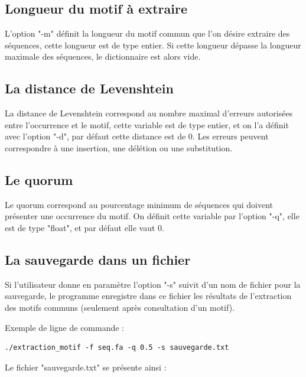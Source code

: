 \documentclass[a4paper,12pt]{article}
\begin{document}
\subsection{Longueur du motif à extraire}

L'option "-m" définit la longueur du motif commun que l'on désire extraire des séquences, cette longueur est de type entier. Si cette longueur dépasse la longueur maximale des séquences, le dictionnaire est alors vide.  
\newpage
\subsection{La distance de Levenshtein}

La distance de Levenshtein correspond au nombre maximal d'erreurs autorisées entre l'occurrence et le motif, cette variable est de type entier, et on l'a définit avec l'option "-d", par défaut cette distance est de 0. Les erreurs peuvent correspondre à une insertion, une délétion ou une substitution. 

\subsection{Le quorum}

Le quorum correspond au pourcentage minimum de séquences qui doivent présenter une occurrence du motif. On définit cette variable par l'option "-q", elle est de type "float", et par défaut elle vaut 0. 

\subsection{La sauvegarde dans un fichier}

Si l'utilisateur donne en paramètre l'option "-s" suivit d'un nom de fichier pour la sauvegarde, le programme enregistre dans ce fichier les résultats de l'extraction des motifs communs (seulement après consultation d'un motif).

Exemple de ligne de commande : 
\begin{lstlisting}
./extraction_motif -f seq.fa -q 0.5 -s sauvegarde.txt
\end{lstlisting}

Le fichier "sauvegarde.txt" se présente ainsi : \\
\\
\end{document}
